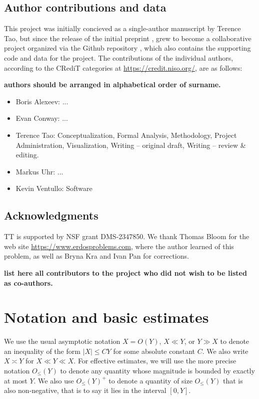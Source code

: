 \documentclass[12pt,a4paper,reqno]{amsart}
\numberwithin{equation}{section}
\theoremstyle{plain}
\theoremstyle{definition}
\begin{document}
\subsection{Author contributions and data}

This project was initially concieved as a single-author manuscript by Terence Tao, but since the release of the initial preprint \cite{tao}, grew to become a collaborative project organized via the Github repository \cite{github}, which also contains the supporting code and data for the project.  The contributions of the individual authors, according to the CRediT categories at \url{https://credit.niso.org/}, are as follows:

{\bf authors should be arranged in alphabetical order of surname.  }

\begin{itemize}
\item Boris Alexeev: ...
\item Evan Conway: ...
\item Terence Tao: Conceptualization, Formal Analysis, Methodology, Project Administration, Visualization, Writing -- original draft, Writing -- review \& editing.
\item Markus Uhr: ...
\item Kevin Ventullo: Software
\end{itemize}

\subsection{Acknowledgments}

TT is supported by NSF grant DMS-2347850.  We thank Thomas Bloom for the web site \url{https://www.erdosproblems.com}, where the author learned of this problem, as well as Bryna Kra and Ivan Pan for  corrections.

{\bf list here all contributors to the project who did not wish to be listed as co-authors.}


\section{Notation and basic estimates}

We use the usual asymptotic notation $X = O(Y)$, $X \ll Y$, or $Y \gg X$ to denote an inequality of the form $|X| \leq CY$ for some absolute constant $C$.  We also write $X \asymp Y$ for $X \ll Y \ll X$. For effective estimates, we will use the more precise notation $O_{\leq}(Y)$ to denote any quantity whose magnitude is bounded by exactly at most $Y$. We also use $O_{\leq}(Y)^+$ to denote a quantity of size $O_{\leq}(Y)$ that is also non-negative, that is to say it lies in the interval $[0,Y]$.
\end{document}
